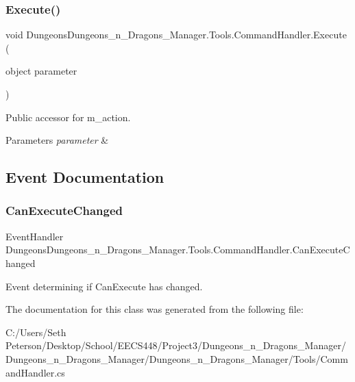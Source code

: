 \subsubsection{\texorpdfstring{Execute()}{Execute()}}
{\footnotesize\ttfamily void Dungeons\+Dungeons\+\_\+n\+\_\+\+Dragons\+\_\+\+Manager.\+Tools.\+Command\+Handler.\+Execute (\begin{DoxyParamCaption}\item[{object}]{parameter }\end{DoxyParamCaption})\hspace{0.3cm}{\ttfamily [inline]}}



Public accessor for m\+\_\+action. 


\begin{DoxyParams}{Parameters}
{\em parameter} & \\
\hline
\end{DoxyParams}


\subsection{Event Documentation}
\mbox{\label{class_dungeons_dungeons__n___dragons___manager_1_1_tools_1_1_command_handler_a8f528cca4266f4619a35c38fc7524eef}} 
\subsubsection{\texorpdfstring{Can\+Execute\+Changed}{CanExecuteChanged}}
{\footnotesize\ttfamily Event\+Handler Dungeons\+Dungeons\+\_\+n\+\_\+\+Dragons\+\_\+\+Manager.\+Tools.\+Command\+Handler.\+Can\+Execute\+Changed}



Event determining if Can\+Execute has changed. 



The documentation for this class was generated from the following file\+:\begin{DoxyCompactItemize}
\item 
C\+:/\+Users/\+Seth Peterson/\+Desktop/\+School/\+E\+E\+C\+S448/\+Project3/\+Dungeons\+\_\+n\+\_\+\+Dragons\+\_\+\+Manager/\+Dungeons\+\_\+n\+\_\+\+Dragons\+\_\+\+Manager/\+Dungeons\+\_\+n\+\_\+\+Dragons\+\_\+\+Manager/\+Tools/Command\+Handler.\+cs\end{DoxyCompactItemize}
